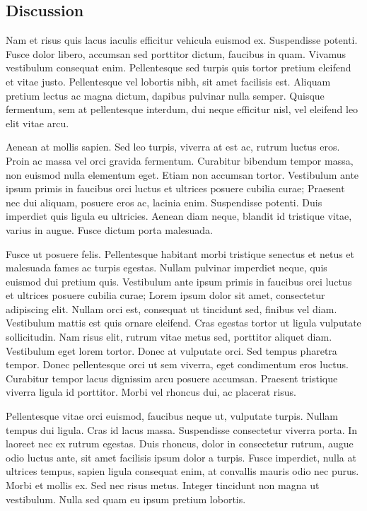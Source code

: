 \begin{refsection}
\section{Discussion}

Nam et risus quis lacus iaculis efficitur vehicula euismod ex. Suspendisse potenti. Fusce dolor libero, accumsan sed porttitor dictum, faucibus in quam. Vivamus vestibulum consequat enim. Pellentesque sed turpis quis tortor pretium eleifend et vitae justo. Pellentesque vel lobortis nibh, sit amet facilisis est. Aliquam pretium lectus ac magna dictum, dapibus pulvinar nulla semper. Quisque fermentum, sem at pellentesque interdum, dui neque efficitur nisl, vel eleifend leo elit vitae arcu.

Aenean at mollis sapien. Sed leo turpis, viverra at est ac, rutrum luctus eros. Proin ac massa vel orci gravida fermentum. Curabitur bibendum tempor massa, non euismod nulla elementum eget. Etiam non accumsan tortor. Vestibulum ante ipsum primis in faucibus orci luctus et ultrices posuere cubilia curae; Praesent nec dui aliquam, posuere eros ac, lacinia enim. Suspendisse potenti. Duis imperdiet quis ligula eu ultricies. Aenean diam neque, blandit id tristique vitae, varius in augue. Fusce dictum porta malesuada.

Fusce ut posuere felis. Pellentesque habitant morbi tristique senectus et netus et malesuada fames ac turpis egestas. Nullam pulvinar imperdiet neque, quis euismod dui pretium quis. Vestibulum ante ipsum primis in faucibus orci luctus et ultrices posuere cubilia curae; Lorem ipsum dolor sit amet, consectetur adipiscing elit. Nullam orci est, consequat ut tincidunt sed, finibus vel diam. Vestibulum mattis est quis ornare eleifend. Cras egestas tortor ut ligula vulputate sollicitudin. Nam risus elit, rutrum vitae metus sed, porttitor aliquet diam. Vestibulum eget lorem tortor. Donec at vulputate orci. Sed tempus pharetra tempor. Donec pellentesque orci ut sem viverra, eget condimentum eros luctus. Curabitur tempor lacus dignissim arcu posuere accumsan. Praesent tristique viverra ligula id porttitor. Morbi vel rhoncus dui, ac placerat risus.

Pellentesque vitae orci euismod, faucibus neque ut, vulputate turpis. Nullam tempus dui ligula. Cras id lacus massa. Suspendisse consectetur viverra porta. In laoreet nec ex rutrum egestas. Duis rhoncus, dolor in consectetur rutrum, augue odio luctus ante, sit amet facilisis ipsum dolor a turpis. Fusce imperdiet, nulla at ultrices tempus, sapien ligula consequat enim, at convallis mauris odio nec purus. Morbi et mollis ex. Sed nec risus metus. Integer tincidunt non magna ut vestibulum. Nulla sed quam eu ipsum pretium lobortis.


\end{refsection}
